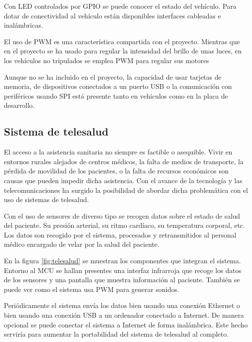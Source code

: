 
Con LED controlados por GPIO se puede conocer el estado del vehículo. Para
dotar de conectividad al vehículo están disponibles interfaces cableadas e
inalámbricas.

El uso de PWM es una característica compartida con el proyecto. Mientras que 
en el proyecto se ha usado para regular la intensidad del brillo de unas
luces, en los vehículos no tripulados se emplea PWM para regular sus motores

Aunque no se ha incluido en el proyecto, la capacidad de usar tarjetas de
memoria, de dispositivos conectados a un puerto USB o la comunicación con
periféricos usando SPI está presente tanto en vehículos como en la placa de
desarrollo.

\subsection{Sistema de telesalud}{\label{sec:salud}}
El acceso a la asistencia sanitaria no siempre es factible o asequible. Vivir
en entornos rurales alejados de centros médicos, la falta de medios de
transporte, la pérdida de movilidad de los pacientes, o la falta de recursos
económicos son causas que pueden impedir dicha asistencia. Con el avance de la
tecnología y las telecomunicaciones ha surgido la posibilidad de abordar dicha
problemática con el uso de sistemas de telesalud.

Con el uso de sensores de diverso tipo se recogen datos sobre el estado de salud
del paciente. Su presión arterial, su ritmo cardíaco, su temperatura corporal,
etc. Los datos son recogido por el sistema, procesados y retransmitidos al
personal médico encargado de velar por la salud del paciente.

En la figura \ref{fig:telesalud} se muestran los componentes que integran el
sistema. Entorno al MCU se hallan presentes una interfaz infrarroja que recoge
los datos de los sensores y una pantalla que muestra información al paciente.
También se puede ver como el sistema usa PWM para generar sonidos.

Periódicamente el sistema envía los datos bien usando una conexión Ethernet o
bien usando una conexión USB a un ordenador conectado a Internet. De manera 
opcional se puede conectar el sistema a Internet de forma inalámbrica. Este
hecho serviría para aumentar la portabilidad del sistema de telesalud al
completo.


